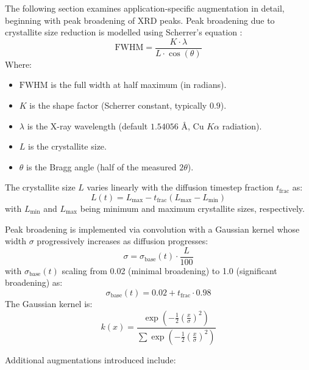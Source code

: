 The following section examines application-specific augmentation in detail, beginning with peak broadening of XRD peaks.
Peak broadening due to crystallite size reduction is modelled using Scherrer's equation \cite{scherrer1918determination}:
\begin{equation}
\text{FWHM} = \frac{K \cdot \lambda}{L \cdot \cos(\theta)}
\end{equation}
Where:
\begin{itemize}
    \item \( \text{FWHM} \) is the full width at half maximum (in radians).
    \item \( K \) is the shape factor (Scherrer constant, typically \(0.9\)).
    \item \( \lambda \) is the X-ray wavelength (default \(1.54056\) Å, Cu $K\alpha$ radiation).
    \item \( L \) is the crystallite size.
    \item \( \theta \) is the Bragg angle (half of the measured \(2\theta\)).
\end{itemize}

The crystallite size \( L \) varies linearly with the diffusion timestep fraction \( t_{\text{frac}} \) as:
\begin{equation}
L(t) = L_{\text{max}} - t_{\text{frac}}(L_{\text{max}} - L_{\text{min}})
\end{equation}
with \(L_{\text{min}}\) and \(L_{\text{max}}\) being minimum and maximum crystallite sizes, respectively.


Peak broadening is implemented via convolution with a Gaussian kernel whose width \( \sigma \) progressively increases as diffusion progresses:
\begin{equation}
\sigma = \sigma_{\text{base}}(t) \cdot \frac{L}{100}
\end{equation}
with \( \sigma_{\text{base}}(t) \) scaling from 0.02 (minimal broadening) to 1.0 (significant broadening) as:
\begin{equation}
\sigma_{\text{base}}(t) = 0.02 + t_{\text{frac}} \cdot 0.98
\end{equation}
The Gaussian kernel is:
\begin{equation}
k(x) = \frac{\exp\left(-\frac{1}{2}\left(\frac{x}{\sigma}\right)^2\right)}{\sum \exp\left(-\frac{1}{2}\left(\frac{x}{\sigma}\right)^2\right)}
\end{equation}


Additional augmentations introduced include:

